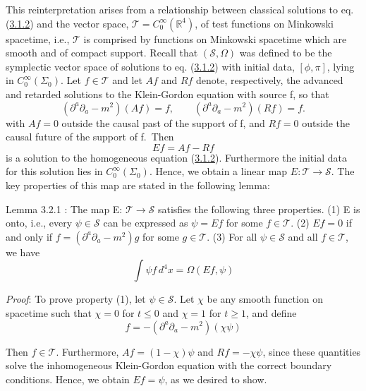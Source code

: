 \documentclass[11pt,a4paper]{article}
\begin{document}
This reinterpretation arises from a relationship between classical solutions to eq. (\hyperref[eq:3.1.2]{3.1.2}) and the vector space, \(\mathcal{T}=C_0^\infty(\mathbb{R}^4)\), of test functions on Minkowski spacetime, i.e., \(\mathcal{T}\) is comprised by functions on Minkowski spacetime which are smooth and of compact support. Recall that \((\mathcal{S},\Omega)\) was defined to be the symplectic vector space of solutions to eq. (\hyperref[eq:3.1.2]{3.1.2}) with initial data, \([\phi,\pi]\), lying in \(C_0^\infty(\Sigma_0)\). Let \(f\in \mathcal{T}\) and let \(Af\) and \(Rf\) denote, respectively, the advanced and retarded solutions to the Klein-Gordon equation with source f, so that
\begin{equation*}
(\partial^a\partial_a-m^2)(Af)=f,\qquad
(\partial^a\partial_a-m^2)(Rf)=f.
\tag{3.2.21}\label{eq:3.2.21}
\end{equation*}
with \(Af=0\) outside the causal past of the support of f, and \(Rf=0\) outside the causal future of the support of f.~Then
\begin{equation*}
Ef = Af - Rf \tag{3.2.22}\label{eq:3.2.22}
\end{equation*} \hypertarget{source-57}{} is a solution to the homogeneous equation (\hyperref[eq:3.1.2]{3.1.2}). Furthermore the initial data for this solution lies in \(C_0^\infty(\Sigma_0)\). Hence, we obtain a linear map \(E: \mathcal{T} \to \mathcal{S}\). The key properties of this map are stated in the following lemma:

Lemma 3.2.1 : The map E: \(\mathcal{T}\to \mathcal{S}\) satisfies the following three properties. (1) E is onto, i.e., every \(\psi\in \mathcal{S}\) can be expressed as \(\psi=Ef\) for some \(f\in \mathcal{T}\). (2) \(Ef=0\) if and only if \(f=(\partial^a\partial_a-m^2)g\) for some \(g\in \mathcal{T}\). (3) For all \(\psi\in \mathcal{S}\) and all \(f\in \mathcal{T}\), we have
\begin{equation*}
\int \psi f \, d^4x = \Omega(Ef, \psi) \tag{3.2.23}\label{eq:3.2.23}
\end{equation*}

\emph{Proof}: To prove property (1), let \(\psi \in \mathcal{S}\). Let \(\chi\) be any smooth function on spacetime such that \(\chi = 0\) for \(t \le 0\) and \(\chi = 1\) for \(t \ge 1\), and define
\begin{equation*}
f = -(\partial^a \partial_a - m^2)(\chi \psi) \tag{3.2.24}\label{eq:3.2.24}
\end{equation*}

Then \(f \in \mathcal{T}\). Furthermore, \(Af = (1-\chi)\psi\) and \(Rf = -\chi \psi\), since these quantities solve the inhomogeneous Klein-Gordon equation with the correct boundary conditions. Hence, we obtain \(Ef = \psi\), as we desired to show.
\end{document}
